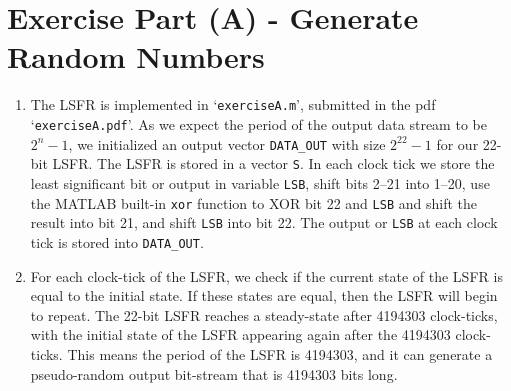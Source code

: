 \section*{Exercise Part (A) - Generate Random Numbers}

\begin{enumerate}[wide, label=(A\arabic*)]

\item
The LSFR is implemented in `\texttt{exerciseA.m}', submitted in the pdf `\texttt{exerciseA.pdf}'. As we expect the period of the output data stream to be $2^n - 1$, we initialized an output vector \texttt{DATA\_OUT} with size $2^{22} - 1$ for our 22-bit LSFR. The LSFR is stored in a vector \texttt{S}. In each clock tick we store the least significant bit or output in variable \texttt{LSB}, shift bits 2--21 into 1--20, use the MATLAB built-in \texttt{xor} function to XOR bit 22 and \texttt{LSB} and shift the result into bit 21, and shift \texttt{LSB} into bit 22. The output or \texttt{LSB} at each clock tick is stored into \texttt{DATA\_OUT}.

\item
For each clock-tick of the LSFR, we check if the current state of the LSFR is equal to the initial state. If these states are equal, then the LSFR will begin to repeat. The 22-bit LSFR reaches a steady-state after 4194303 clock-ticks, with the initial state of the LSFR appearing again after the 4194303 clock-ticks. This means the period of the LSFR is 4194303, and it can generate a pseudo-random output bit-stream that is 4194303 bits long.


\end{enumerate}
